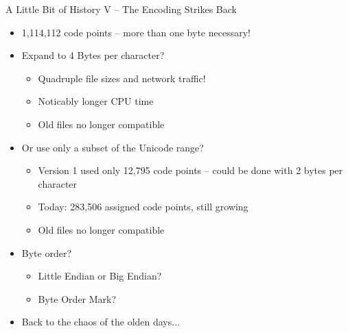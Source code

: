 
\begin{frame}{A Little Bit of History V -- The Encoding Strikes Back}
%
\begin{itemize}
\item 1,114,112 code points -- more than one byte necessary!
\item Expand to 4 Bytes per character?
	\begin{itemize}
	\item Quadruple file sizes and network traffic!
	\item Noticably longer CPU time
	\item Old files no longer compatible
	\end{itemize}
\item Or use only a subset of the Unicode range?
	\begin{itemize}
	\item Version 1 used only 12,795 code points -- could be done with 2 bytes per character
	\item Today: 283,506 assigned code points, still growing
	\item Old files no longer compatible
	\end{itemize}
\item Byte order?
	\begin{itemize}
	\item Little Endian or Big Endian?
	\item Byte Order Mark?
	\end{itemize}
\item[\Thus] Back to the chaos of the olden days...
\end{itemize}
%
\end{frame}


